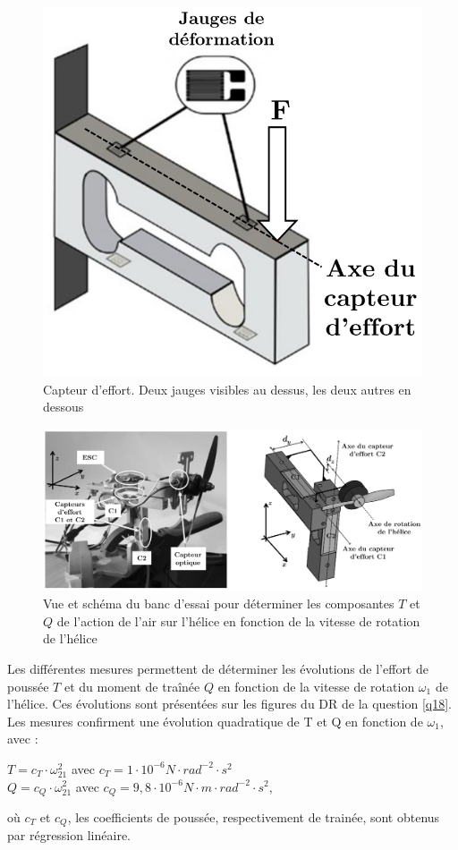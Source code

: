 \begin{figure}[ht!]
\begin{center}
 \includegraphics[width=0.35\linewidth]{img/fig16}
\end{center}
\caption{\label{fig16} Capteur d'effort. Deux jauges visibles au dessus, les deux autres en dessous}
\end{figure}

\begin{figure}[ht!]
\begin{center}
 \includegraphics[width=0.85\linewidth]{img/fig17}
\end{center}
\caption{\label{fig17} Vue et schéma du banc d'essai pour déterminer les composantes $T$ et $Q$ de l'action de l'air sur l'hélice en fonction de la vitesse de rotation de l'hélice}
\end{figure}

Les différentes mesures permettent de déterminer les évolutions de l'effort de poussée $T$ et du moment de traînée $Q$ en fonction de la vitesse de rotation $\omega_1$ de l'hélice. Ces évolutions sont présentées sur les figures du DR de la question \ref{q18}. Les mesures confirment une évolution quadratique de T et Q en fonction de $\omega_1$, avec :
\begin{center}
$T=c_T\cdot\omega_{21}^2$ avec $c_T=1\cdot 10^{-6} N\cdot rad^{-2}\cdot s^2$\\
$Q=c_Q\cdot\omega_{21}^2$ avec $c_Q=9,8\cdot 10^{-6} N\cdot m\cdot rad^{-2}\cdot s^2$,
\end{center}

où $c_T$ et $c_Q$, les coefficients de poussée, respectivement de trainée, sont obtenus par régression linéaire.

